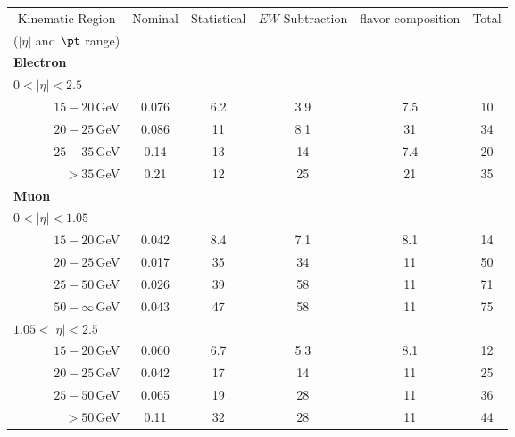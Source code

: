 \begin{tabular}{c|c|c|c|c|c}
    \toprule
    Kinematic Region                        & Nominal & Statistical & $EW$ Subtraction & flavor composition & Total \\
    ($|\eta|$ and $\pt$ range)              &       &             &                &                    &       \\
    \midrule
    \multicolumn{1}{l|}{\textbf{Electron}} &       &             &                &                    &       \\
    \multicolumn{1}{l|}{$0<|\eta|<2.5$}   &       &             &                &                    &       \\
    \multicolumn{1}{r|}{$15-20$\,GeV}    & 0.076 & 6.2         & 3.9            & 7.5                & 10    \\
    \multicolumn{1}{r|}{$20-25$\,GeV}    & 0.086 & 11          & 8.1            & 31                 & 34    \\
    \multicolumn{1}{r|}{$25-35$\,GeV}    & 0.14  & 13          & 14             & 7.4                & 20    \\
    \multicolumn{1}{r|}{$> 35$\,GeV} & 0.21  & 12          & 25             & 21                 & 35    \\
    \midrule
    \multicolumn{1}{l|}{\textbf{Muon}}     &       &             &                &                    &       \\
    \multicolumn{1}{l|}{$0<|\eta|<1.05$}  &       &             &                &                    &       \\
    \multicolumn{1}{r|}{$15-20$\,GeV}    & 0.042 & 8.4         & 7.1            & 8.1                & 14    \\
    \multicolumn{1}{r|}{$20-25$\,GeV}    & 0.017 & 35          & 34             & 11                 & 50    \\
    \multicolumn{1}{r|}{$25-50$\,GeV}    & 0.026 & 39          & 58             & 11                 & 71    \\
    \multicolumn{1}{r|}{$50-\infty$\,GeV}  & 0.043 & 47          & 58             & 11                 & 75    \\
    \multicolumn{1}{l|}{$1.05<|\eta|<2.5$}  &       &             &                &                    &       \\
    \multicolumn{1}{r|}{$15-20$\,GeV}    & 0.060 & 6.7         & 5.3            & 8.1                & 12    \\
    \multicolumn{1}{r|}{$20-25$\,GeV}    & 0.042 & 17          & 14             & 11                 & 25    \\
    \multicolumn{1}{r|}{$25-50$\,GeV}    & 0.065 & 19          & 28             & 11                 & 36    \\
    \multicolumn{1}{r|}{$> 50$\,GeV}  & 0.11  & 32          & 28             & 11                 & 44    \\
    \bottomrule
    \end{tabular}
    